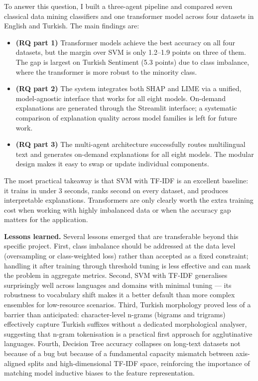 \documentclass[conference]{IEEEtran}
\begin{document}
To answer this question, I built a three-agent pipeline and compared seven classical data
mining classifiers and one transformer model across four datasets in English and Turkish.
The main findings are:
\begin{itemize}
  \item \textbf{(RQ part 1)} Transformer models achieve the best accuracy on all four
        datasets, but the margin over SVM is only 1.2--1.9 points on three of them. The
        gap is largest on Turkish Sentiment (5.3 points) due to class imbalance, where the
        transformer is more robust to the minority class.
  \item \textbf{(RQ part 2)} The system integrates both SHAP and LIME via a unified,
        model-agnostic interface that works for all eight models. On-demand explanations
        are generated through the Streamlit interface; a systematic comparison of
        explanation quality across model families is left for future work.
  \item \textbf{(RQ part 3)} The multi-agent architecture successfully routes multilingual
        text and generates on-demand explanations for all eight models. The modular design
        makes it easy to swap or update individual components.
\end{itemize}
The most practical takeaway is that SVM with TF-IDF is an excellent baseline: it trains
in under 3 seconds, ranks second on every dataset, and produces interpretable explanations.
Transformers are only clearly worth the extra training cost when working with highly
imbalanced data or when the accuracy gap matters for the application.

\textbf{Lessons learned.} Several lessons emerged that are transferable beyond this
specific project. First, class imbalance should be addressed at the data level (oversampling
or class-weighted loss) rather than accepted as a fixed constraint; handling it after
training through threshold tuning is less effective and can mask the problem in aggregate
metrics. Second, SVM with TF-IDF generalises surprisingly well across languages and domains
with minimal tuning --- its robustness to vocabulary shift makes it a better default than
more complex ensembles for low-resource scenarios. Third, Turkish morphology proved less of
a barrier than anticipated: character-level n-grams (bigrams and trigrams) effectively
capture Turkish suffixes without a dedicated morphological analyser, suggesting that
n-gram tokenisation is a practical first approach for agglutinative languages. Fourth,
Decision Tree accuracy collapses on long-text datasets not because of a bug but because of
a fundamental capacity mismatch between axis-aligned splits and high-dimensional TF-IDF
space, reinforcing the importance of matching model inductive biases to the feature
representation.
\end{document}
